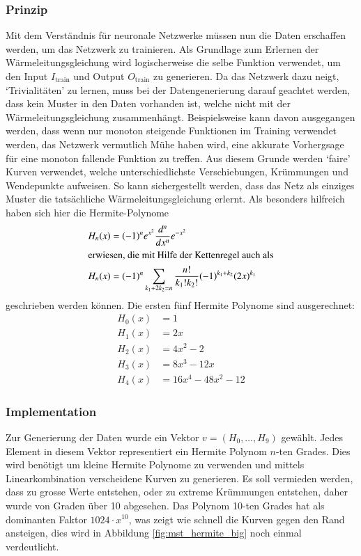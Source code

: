 \subsubsection{Prinzip}
Mit dem Verständnis für neuronale Netzwerke müssen nun die Daten
erschaffen werden, um das Netzwerk zu trainieren. Als Grundlage zum
Erlernen der Wärmeleitungsgleichung wird logischerweise die selbe
Funktion verwendet, um den Input $I_{\text{train}}$ und Output
$O_{\text{train}}$ zu generieren. Da das Netzwerk dazu neigt,
`Trivialitäten' zu lernen, muss bei der Datengenerierung darauf geachtet
werden, dass kein Muster in den Daten vorhanden ist, welche nicht
mit der Wärmeleitungsgleichung zusammenhängt. Beispielsweise kann
davon ausgegangen werden, dass wenn nur monoton steigende Funktionen
im Training verwendet werden, das Netzwerk vermutlich Mühe haben wird,
eine akkurate Vorhergsage für eine monoton fallende Funktion zu
treffen. Aus diesem Grunde werden `faire' Kurven verwendet, welche
unterschiedlichste Verschiebungen, Krümmungen und Wendepunkte
aufweisen. So kann sichergestellt werden, dass das Netz als einziges
Muster die tatsächliche Wärmeleitungsgleichung erlernt. Als besonders
hilfreich haben sich hier die Hermite-Polynome
\begin{align}
	H_n(x) &=(-1)^{n}e^{x^{2}}{\frac {d^{n}}{d x^{n}}}e^{-x^{2}}
	\\
	\intertext{erwiesen, die mit Hilfe der Kettenregel auch als}
	H_n(x) &=(-1)^{n}\sum _{k_{1}+2k_{2}=n}{\frac {n!}{k_{1}!k_{2}!}}(-1)^{k_{1}+k_{2}}(2x)^{k_{1}}
\end{align}
geschrieben werden können.
Die ersten fünf Hermite Polynome sind ausgerechnet:
\begin{align}
H_{0}(x) &= 1\\
H_{1}(x) &= 2x\\
H_{2}(x) &= 4x^{2}-2\\
H_{3}(x) &= 8x^{3}-12x\\
H_{4}(x) &= 16x^{4}-48x^{2}-12
\end{align}

\subsubsection{Implementation}
Zur Generierung der Daten wurde ein Vektor $v=(H_0, \dots ,H_9)$ gewählt. Jedes Element in diesem Vektor representiert ein Hermite Polynom $n$-ten Grades. Dies wird benötigt um kleine Hermite Polynome zu verwenden und mittels Linearkombination verscheidene Kurven zu generieren. Es soll vermieden werden, dass zu grosse Werte entstehen, oder zu extreme Krümmungen entstehen, daher wurde von Graden über 10 abgesehen. Das Polynom 10-ten Grades hat als dominanten Faktor $1024 \cdot x^{10}$, was zeigt wie schnell die Kurven gegen den Rand ansteigen, dies wird in Abbildung \ref{fig:mst_hermite_big} noch einmal verdeutlicht.

